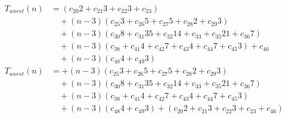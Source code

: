 \begin{subequations}
\label{eq:analyse-argetconout-contour}
\begin{align}
\label{eq:analyse-argetconout-contour-1}
T_{worst}(n)& =
(c_{20}2 + c_{21}3 + c_{22}3 + c_{23})
\\
& \quad
+ (n-3)(c_{25}3 + c_{26}5 + c_{27}5 + c_{28}2 + c_{29}3)
\nonumber \\
& \quad
+ (n-3)(c_{30}8 + c_{31}35 + c_{32}14 + c_{33} + c_{35}21 + c_{36}7)
\nonumber \\
& \quad
+ (n-3)(c_{38} + c_{41}4 + c_{42}7 + c_{43}4 + c_{44}7 + c_{45}3)
+ c_{46}
\nonumber \\
& \quad
+ (n-3)(c_{48}4 + c_{49}3)
\nonumber \\
\label{eq:analyse-argetconout-contour-1}
T_{worst}(n)& =
+ (n-3)(c_{25}3 + c_{26}5 + c_{27}5 + c_{28}2 + c_{29}3)
\nonumber \\
& \quad
+ (n-3)(c_{30}8 + c_{31}35 + c_{32}14 + c_{33} + c_{35}21 + c_{36}7)
\nonumber \\
& \quad
+ (n-3)(c_{38} + c_{41}4 + c_{42}7 + c_{43}4 + c_{44}7 + c_{45}3)
\nonumber \\
& \quad
+ (n-3)(c_{48}4 + c_{49}3)
+ (c_{20}2 + c_{21}3 + c_{22}3 + c_{23} + c_{46})
\nonumber
\end{align}
\end{subequations}

